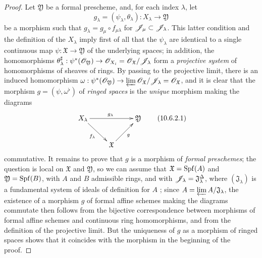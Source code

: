 \begin{proof}
\label{proof-1.10.6.2}
Let $\mathfrak{Y}$ be a formal prescheme, and, for each index $\lambda$, let
\[
  g_\lambda=(\psi_\lambda,\theta_\lambda):X_\lambda\to\mathfrak{Y}
\]
be a morphism such that $g_\lambda=g_\mu\circ f_{\mu\lambda}$ for $\mathscr{J}_\mu\subset\mathscr{J}_\lambda$.
This latter condition and the definition of the $X_\lambda$ imply first of all that the $\psi_\lambda$ are identical to a single continuous map $\psi:\mathfrak{X}\to\mathfrak{Y}$ of the underlying spaces; in addition, the homomorphisms $\theta_\lambda^\sharp:\psi^*(\sh{O}_\mathfrak{Y})\to\sh{O}_{X_i}=\sh{O}_\mathfrak{X}/\sh{J}_\lambda$ form a \emph{projective system} of homomorphisms of sheaves of rings.
By passing to the projective limit, there is an induced homomorphism $\omega:\psi^*(\sh{O}_\mathfrak{Y})\to\varprojlim\sh{O}_\mathfrak{X}/\sh{J}_\lambda=\sh{O}_\mathfrak{X}$, and it is clear that the morphism $g=(\psi,\omega^\flat)$ of \emph{ringed spaces} is the \emph{unique} morphism making the diagrams
\begin{equation*}
\label{1.10.6.2.1}
  \xymatrix{
    X_\lambda\ar[rr]^{g_\lambda}\ar[rd]_{f_\lambda} & &
    \mathfrak{Y}\\
    & \mathfrak{X}\ar[ru]_g
  }
  \tag{10.6.2.1}
\end{equation*}
commutative.
It remains to prove that $g$ is a morphism of \emph{formal preschemes}; the question is local on $\mathfrak{X}$ and $\mathfrak{Y}$, so we can assume that $\mathfrak{X}=\operatorname{Spf}(A)$ and $\mathfrak{Y}=\operatorname{Spf}(B)$, with $A$ and $B$ admissible rings, and with $\mathscr{J}_\lambda=\mathfrak{J}_\lambda^\Delta$, where $(\mathfrak{J}_\lambda)$ is a fundamental system of ideals of definition for $A$ ; since $A=\varprojlim A/\mathfrak{J}_\lambda$, the existence of a morphism $g$ of formal affine schemes making the diagrams  commutate then follows from the bijective correspondence  between morphisms of formal affine schemes and continuous ring homomorphisms, and from the definition of the projective limit.
But the uniqueness of $g$ as a morphism of ringed spaces shows that it coincides with the morphism in the beginning of the proof.
\end{proof}

